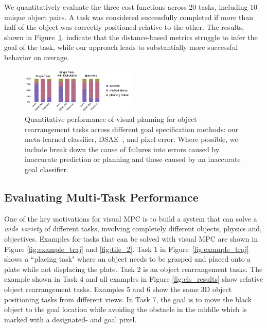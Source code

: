 We quantitatively evaluate the three cost functions across 20 tasks, including $10$ unique object pairs. A task was considered successfully completed if more than half of the object was correctly positioned relative to the other. The results, shown in Figure~\ref{fig:cls_charts}, indicate that the distance-based metrics struggle to infer the goal of the task, while our approach leads to substantially more successful behavior on average.


\begin{figure}
    \centering
    \includegraphics[width=0.48\textwidth]{images_cls/cls_charts_2.jpeg}
    \caption{\small Quantitative performance of visual planning for object rearrangement tasks across different goal specification methods: our meta-learned classifier, DSAE~\cite{dsae}, and pixel error. Where possible, we include break down the cause of failures into errors caused by inaccurate prediction or planning and those caused by an inaccurate goal classifier.}
    \label{fig:cls_charts}
    \vspace{-0.3cm}
\end{figure}


\subsection{Evaluating Multi-Task Performance}
\label{subsec:multi_task_bench}
One of the key motivations for visual MPC is to build a system that can solve a \emph{wide variety} of different tasks, involving completely different objects, physics and, objectives.
Examples for tasks that can be solved with visual MPC are shown in Figure \ref{fig:example_traj}
and \ref{fig:tile_2}. Task 1 in Figure~\ref{fig:example_traj} shows a ``placing task" where an object needs to be grasped and placed onto a plate while not displacing the plate. Task 2 is an object rearrangement tasks. The example shown in Task 4 and all examples in Figure \ref{fig:cls_results} show relative object rearrangement tasks. Examples 5 and 6 show the same 3D object positioning tasks from different views. In Task 7, the goal is to move the black object to the goal location while avoiding the obstacle in the middle which is marked with a designated- and goal pixel. 

